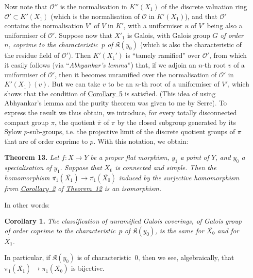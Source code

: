 \documentclass{article}
\newenvironment{itenv}[1]
  {\phantomsection\par\medskip\noindent\textbf{#1.}\itshape}
  {\medskip}
\newcommand{\scr}[1]{{\mathscr{#1}}}
\newcommand{\kres}{\mathfrak{K}}
\newcommand{\oldpage}[1]{\marginpar{\footnotesize$\Big\vert$ \textit{p.~#1}}}
\begin{document}
Now note that $\scr{O}''$ is the normalisation in $K''(X_1)$ of the discrete valuation ring $\scr{O}'\subset K'(X_1)$ (which is the normalisation of $\scr{O}$ in $K'(X_1)$), and that $\scr{O}'$ contains the normalisation $V'$ of $V$ in $K'$, with a uniformiser $u$ of $V'$ being also a uniformiser of $\scr{O}'$.
Suppose now that $X'_1$ is Galois, with Galois group $G$ \emph{of order $n$, coprime to the characteristic~$p$ of $\kres(y_0)$} (which is also the characteristic of the residue field of $\scr{O}'$).
Then $K'(X_1')$ is ``tamely ramified'' over $\scr{O}'$, from which it easily follows (via ``\emph{Abhyankar's lemma}'') that, if we adjoin an $n$-th root $v$ of a uniformiser of $\scr{O}'$, then it becomes unramified over the normalisation of $\scr{O}'$ in $K'(X_1)(v)$.
But we can take $v$ to be an $n$-th root of a uniformiser of $V'$, which shows that the condition of \hyperref[theorem12corollary5]{Corollary~5} is satisfied.
(This idea of using Abhyankar's lemma and the purity theorem was given to me by Serre).
To express the result we thus obtain, we introduce, for every totally disconnected compact group $\pi$, the quotient $\overline{\pi}$ of $\pi$ by the closed subgroup generated by its Sylow $p$-sub-groups, i.e. the projective limit of the discrete quotient groups of $\pi$ that are of order coprime to $p$.
With this notation, we obtain:

\begin{itenv}{Theorem 13}
\label{theorem13}
  Let $f\colon X\to Y$ be a proper flat morphism, $y_1$ a point of $Y$, and $y_0$ a specialisation of $y_1$.
  Suppose that $\overline{X_0}$ is connected and simple.
  Then the homomorphism $\overline{\pi_1}(\overline{X_1})\to\overline{\pi_1}(\overline{X_0})$ induced by the
\oldpage{182-27}
  surjective homomorphism from \hyperref[theorem12corollary2]{Corollary~2} of \hyperref[theorem12]{Theorem~12} is an \emph{isomorphism}.
\end{itenv}

In other words:

\begin{itenv}{Corollary 1}
\label{theorem13corollary1}
  The classification of unramified Galois coverings, of Galois group of order coprime to the characteristic~$p$ of $\kres(y_0)$, is the same for $\overline{X_0}$ and for $\overline{X_1}$.
\end{itenv}

In particular, if $\kres(y_0)$ is of characteristic~$0$, then we see, algebraically, that $\pi_1(\overline{X_1})\to\pi_1(\overline{X_0})$ is bijective.
\end{document}
